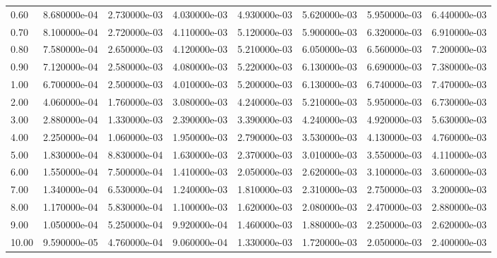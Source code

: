 \begin{tabular}{lrrrrrrr}
0.60  &  8.680000e-04 &  2.730000e-03 &  4.030000e-03 &  4.930000e-03 &  5.620000e-03 &  5.950000e-03 &  6.440000e-03 \\
0.70  &  8.100000e-04 &  2.720000e-03 &  4.110000e-03 &  5.120000e-03 &  5.900000e-03 &  6.320000e-03 &  6.910000e-03 \\
0.80  &  7.580000e-04 &  2.650000e-03 &  4.120000e-03 &  5.210000e-03 &  6.050000e-03 &  6.560000e-03 &  7.200000e-03 \\
0.90  &  7.120000e-04 &  2.580000e-03 &  4.080000e-03 &  5.220000e-03 &  6.130000e-03 &  6.690000e-03 &  7.380000e-03 \\
1.00  &  6.700000e-04 &  2.500000e-03 &  4.010000e-03 &  5.200000e-03 &  6.130000e-03 &  6.740000e-03 &  7.470000e-03 \\
2.00  &  4.060000e-04 &  1.760000e-03 &  3.080000e-03 &  4.240000e-03 &  5.210000e-03 &  5.950000e-03 &  6.730000e-03 \\
3.00  &  2.880000e-04 &  1.330000e-03 &  2.390000e-03 &  3.390000e-03 &  4.240000e-03 &  4.920000e-03 &  5.630000e-03 \\
4.00  &  2.250000e-04 &  1.060000e-03 &  1.950000e-03 &  2.790000e-03 &  3.530000e-03 &  4.130000e-03 &  4.760000e-03 \\
5.00  &  1.830000e-04 &  8.830000e-04 &  1.630000e-03 &  2.370000e-03 &  3.010000e-03 &  3.550000e-03 &  4.110000e-03 \\
6.00  &  1.550000e-04 &  7.500000e-04 &  1.410000e-03 &  2.050000e-03 &  2.620000e-03 &  3.100000e-03 &  3.600000e-03 \\
7.00  &  1.340000e-04 &  6.530000e-04 &  1.240000e-03 &  1.810000e-03 &  2.310000e-03 &  2.750000e-03 &  3.200000e-03 \\
8.00  &  1.170000e-04 &  5.830000e-04 &  1.100000e-03 &  1.620000e-03 &  2.080000e-03 &  2.470000e-03 &  2.880000e-03 \\
9.00  &  1.050000e-04 &  5.250000e-04 &  9.920000e-04 &  1.460000e-03 &  1.880000e-03 &  2.250000e-03 &  2.620000e-03 \\
10.00 &  9.590000e-05 &  4.760000e-04 &  9.060000e-04 &  1.330000e-03 &  1.720000e-03 &  2.050000e-03 &  2.400000e-03 \\
\bottomrule
\end{tabular}
